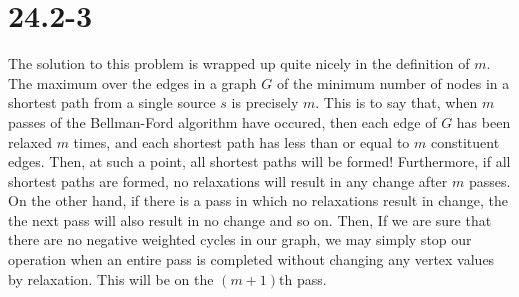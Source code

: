 \documentclass{article}
\begin{document}
  \section*{24.2-3}
    The solution to this problem is wrapped up quite nicely in the definition
    of $m$. 
    The maximum over the edges in a graph $G$ of the minimum number of nodes
    in a shortest path from a single source $s$ is precisely $m$.
    This is to say that, when $m$ passes of the Bellman-Ford algorithm
    have occured, then each edge of $G$ has been relaxed $m$ times, and 
    each shortest path has less than or equal to $m$ constituent edges. 
    Then, at such a point, all shortest paths will be formed!
    Furthermore, if all shortest paths are formed, no relaxations will 
    result in any change after $m$ passes.
    On the other hand, if there is a pass in which no relaxations 
    result in change, the the next pass will also result in no change and so on.
    Then, If we are sure that there are no negative weighted cycles in our graph, we may simply stop our operation when an entire pass is completed without changing any vertex values by relaxation.
    This will be on the $(m+1)$th pass.
\end{document}
